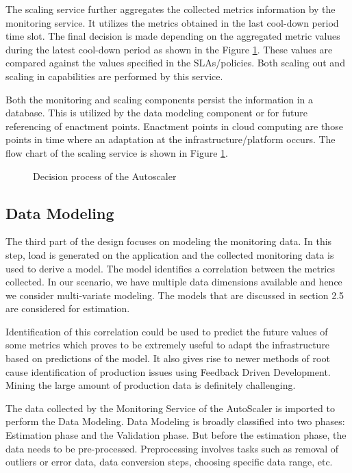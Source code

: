 \documentclass[article,type=msc,colorback,12pt,accentcolor=tud8b,table]{tudthesis}
\begin{document}
 	The scaling service further aggregates the collected metrics information by the monitoring service. It utilizes the metrics obtained in the last cool-down period time slot. The final decision is made depending on the aggregated metric values during the latest cool-down period as shown in the Figure \ref{fig:autoscaler}. These values are compared against the values specified in the SLAs/policies. Both scaling out and scaling in capabilities are performed by this service.
 	 	    
	 Both the monitoring and scaling components persist the information in a database. This is utilized by the data modeling component or for future referencing of enactment points. Enactment points in cloud computing are those points in time where an adaptation at the infrastructure/platform occurs. The flow chart of the scaling service is shown in Figure \ref{fig:autoscaler}.
	 
	  	 	 \begin{figure}[!h]
	  	 	 	\begin{center}
	  	 	 		\makebox[\textwidth]{\texttt{[image: C3]}}
	  	 	 	\end{center}
	  	 	 	\caption{Decision process of the Autoscaler}
	  	 	 	\label{fig:autoscaler}
	  	 	 \end{figure}

 	\subsection{Data Modeling}
 	
 	The third part of the design focuses on modeling the monitoring data. In this step, load is generated on the application and the collected monitoring data is used to derive a model. The model identifies a correlation between the metrics collected. In our scenario, we have multiple data dimensions available and hence we consider multi-variate modeling. The models that are discussed in section 2.5 are considered for estimation. 
 	
	 Identification of this correlation could be used to predict the future values of some metrics which proves to be extremely useful to adapt the infrastructure based on predictions of the model. It also gives rise to newer methods of root cause identification of production issues using Feedback Driven Development. Mining the large amount of production data is definitely challenging.
 	
 	The data collected by the Monitoring Service of the AutoScaler is imported to perform the Data Modeling. Data Modeling is broadly classified into two phases: Estimation phase and the Validation phase. But before the estimation phase, the data needs to be pre-processed. Preprocessing involves tasks such as removal of outliers or error data, data conversion steps, choosing specific data range, etc. 
 	
\end{document}
